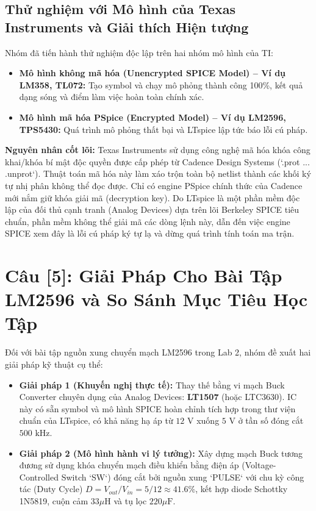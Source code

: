 \documentclass[12pt,a4paper]{report}
\begin{document}
\subsection{Thử nghiệm với Mô hình của Texas Instruments và Giải thích Hiện tượng}
Nhóm đã tiến hành thử nghiệm độc lập trên hai nhóm mô hình của TI:
\begin{itemize}
    \item \textbf{Mô hình không mã hóa (Unencrypted SPICE Model) -- Ví dụ LM358, TL072:} Tạo symbol và chạy mô phỏng thành công 100\%, kết quả dạng sóng và điểm làm việc hoàn toàn chính xác.
    \item \textbf{Mô hình mã hóa PSpice (Encrypted Model) -- Ví dụ LM2596, TPS5430:} Quá trình mô phỏng thất bại và LTspice lập tức báo lỗi cú pháp.
\end{itemize}
\textbf{Nguyên nhân cốt lõi:} Texas Instruments sử dụng công nghệ mã hóa khóa công khai/khóa bí mật độc quyền được cấp phép từ Cadence Design Systems (`.prot ... .unprot`). Thuật toán mã hóa này làm xáo trộn toàn bộ netlist thành các khối ký tự nhị phân không thể đọc được. Chỉ có engine PSpice chính thức của Cadence mới nắm giữ khóa giải mã (decryption key). Do LTspice là một phần mềm độc lập của đối thủ cạnh tranh (Analog Devices) dựa trên lõi Berkeley SPICE tiêu chuẩn, phần mềm không thể giải mã các dòng lệnh này, dẫn đến việc engine SPICE xem đây là lỗi cú pháp ký tự lạ và dừng quá trình tính toán ma trận.

\section*{Câu [5]: Giải Pháp Cho Bài Tập LM2596 và So Sánh Mục Tiêu Học Tập}

Đối với bài tập nguồn xung chuyển mạch LM2596 trong Lab 2, nhóm đề xuất hai giải pháp kỹ thuật cụ thể:
\begin{itemize}
    \item \textbf{Giải pháp 1 (Khuyến nghị thực tế):} Thay thế bằng vi mạch Buck Converter chuyên dụng của Analog Devices: \textbf{LT1507} (hoặc LTC3630). IC này có sẵn symbol và mô hình SPICE hoàn chỉnh tích hợp trong thư viện chuẩn của LTspice, có khả năng hạ áp từ $12\text{ V}$ xuống $5\text{ V}$ ở tần số đóng cắt $500\text{ kHz}$.
    \item \textbf{Giải pháp 2 (Mô hình hành vi lý tưởng):} Xây dựng mạch Buck tương đương sử dụng khóa chuyển mạch điều khiển bằng điện áp (Voltage-Controlled Switch `SW`) đóng cắt bởi nguồn xung `PULSE` với chu kỳ công tác (Duty Cycle) $D = V_{out}/V_{in} = 5/12 \approx 41.6\%$, kết hợp diode Schottky 1N5819, cuộn cảm $33\mu\text{H}$ và tụ lọc $220\mu\text{F}$.
\end{itemize}
\end{document}
